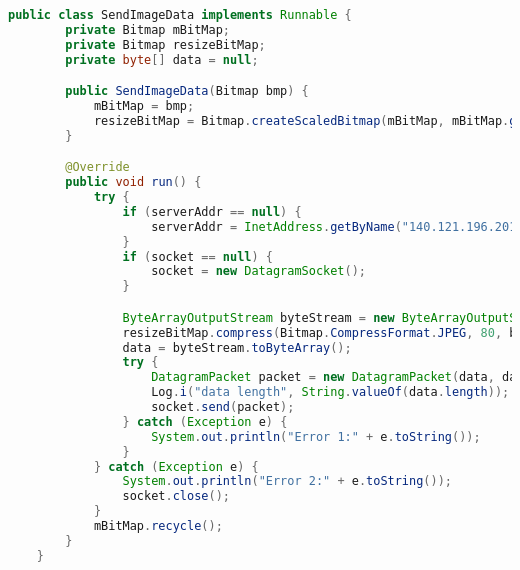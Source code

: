 \begin{lstlisting}[language=Java, caption=傳輸影像至伺服器端]
public class SendImageData implements Runnable {
        private Bitmap mBitMap;
        private Bitmap resizeBitMap;
        private byte[] data = null;

        public SendImageData(Bitmap bmp) {
            mBitMap = bmp;
            resizeBitMap = Bitmap.createScaledBitmap(mBitMap, mBitMap.getWidth() / 10, mBitMap.getHeight() / 10, true);
        }

        @Override
        public void run() {
            try {
                if (serverAddr == null) {
                    serverAddr = InetAddress.getByName("140.121.196.201");
                }
                if (socket == null) {
                    socket = new DatagramSocket();
                }

                ByteArrayOutputStream byteStream = new ByteArrayOutputStream();
                resizeBitMap.compress(Bitmap.CompressFormat.JPEG, 80, byteStream);
                data = byteStream.toByteArray();
                try {
                    DatagramPacket packet = new DatagramPacket(data, data.length, serverAddr, 5000);
                    Log.i("data length", String.valueOf(data.length));
                    socket.send(packet);
                } catch (Exception e) {
                    System.out.println("Error 1:" + e.toString());
                }
            } catch (Exception e) {
                System.out.println("Error 2:" + e.toString());
                socket.close();
            }
            mBitMap.recycle();
        }
    }
\end{lstlisting}
